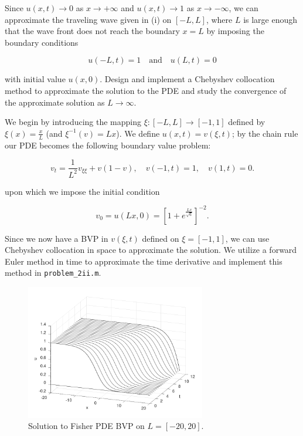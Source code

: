 Since $u(x, t) \to 0$ as $x \to +\infty$ and $u(x, t) \to 1$ as $x \to -\infty$, we can approximate the traveling wave
given in (i) on $[-L, L]$, where $L$ is large enough that the wave front does not reach the boundary $x = L$ by imposing
the boundary conditions

$$
u(-L, t) = 1 \quad \text{and} \quad u(L, t) = 0
$$

with initial value $u(x, 0)$. Design and implement a Chebyshev collocation method to approximate the solution to the
PDE and study the convergence of the approximate solution as $L \to \infty$.

\begin{solution}
    We begin by introducing the mapping $\xi : [-L, L] \to [-1, 1]$ defined by $\xi(x) = \frac{x}{L}$ 
    (and $\xi^{-1}(v) = Lx$). We define $u(x, t) = v(\xi, t)$; by the chain rule our PDE becomes the following
    boundary value problem:

    $$
    v_t = \frac{1}{L^2} v_{\xi\xi} + v(1 - v),  \quad v(-1, t) = 1, \quad v(1, t) = 0.
    $$

    upon which we impose the initial condition

    $$
    v_0 = u(L x, 0) = \left[ 1 + e^{\frac{Lx}{\sqrt{6}}} \right]^{-2}.
    $$

    Since we now have a BVP in $v(\xi, t)$ defined on $\xi = [-1, 1]$, we can use Chebyshev collocation in space to 
    approximate the solution. We utilize a forward Euler method in time to approximate the time derivative and implement
    this method in \texttt{problem\_2ii.m}. 

    \begin{figure}[h]
        \centering
        \includegraphics[width=0.70\textwidth]{problem_2ii_L20.png}
        \caption{Solution to Fisher PDE BVP on $L = [-20, 20]$.}
        \label{fig:problem_2ii_L20}
    \end{figure} 
    

\end{solution}
